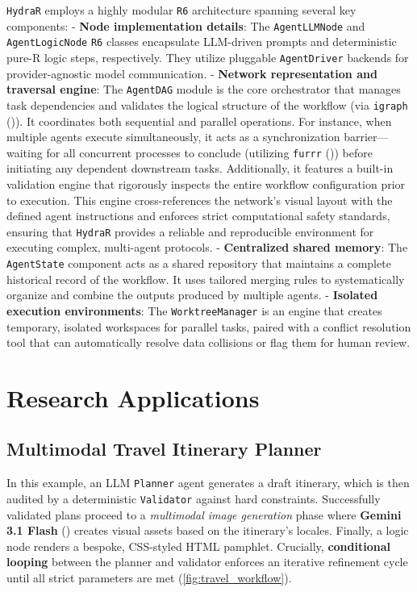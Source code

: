\documentclass[
]{article}
\begin{document}
\texttt{HydraR} employs a highly modular \texttt{R6} architecture
spanning several key components:
- \textbf{Node implementation details}: The \texttt{AgentLLMNode} and \texttt{AgentLogicNode} \texttt{R6} classes encapsulate LLM-driven prompts and deterministic pure-R logic steps, respectively. They utilize pluggable \texttt{AgentDriver} backends for provider-agnostic model communication.
- \textbf{Network representation and traversal engine}: The \texttt{AgentDAG} module is the core orchestrator that manages task dependencies and validates the logical structure of the workflow (via \texttt{igraph} ()). It coordinates both sequential and parallel operations. For instance, when multiple agents execute simultaneously, it acts as a synchronization barrier---waiting for all concurrent processes to conclude (utilizing \texttt{furrr} ()) before initiating any dependent downstream tasks. Additionally, it features a built-in validation engine that rigorously inspects the entire workflow configuration prior to execution. This engine cross-references the network's visual layout with the defined agent instructions and enforces strict computational safety standards, ensuring that \texttt{HydraR} provides a reliable and reproducible environment for executing complex, multi-agent protocols.
- \textbf{Centralized shared memory}: The \texttt{AgentState} component acts as a shared repository that maintains a complete historical record of the workflow. It uses tailored merging rules to systematically organize and combine the outputs produced by multiple agents.
- \textbf{Isolated execution environments}: The \texttt{WorktreeManager} is an engine that creates temporary, isolated workspaces for parallel tasks, paired with a conflict resolution tool that can automatically resolve data collisions or flag them for human review.

\section{Research Applications}\label{research-applications}

\subsection{Multimodal Travel Itinerary
Planner}\label{multimodal-travel-itinerary-planner}

In this example, an LLM \texttt{Planner} agent generates a draft
itinerary, which is then audited by a deterministic \texttt{Validator}
against hard constraints. Successfully validated plans proceed to a
\emph{multimodal image generation} phase where \textbf{Gemini 3.1 Flash}
() creates visual assets
based on the itinerary's locales. Finally, a logic node renders a
bespoke, CSS-styled HTML pamphlet. Crucially, \textbf{conditional
looping} between the planner and validator enforces an iterative
refinement cycle until all strict parameters are met
(\autoref{fig:travel_workflow}).
\end{document}
